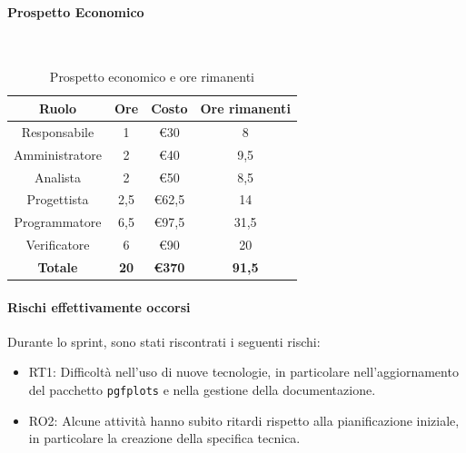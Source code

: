 \documentclass{article}
\begin{document}
            \paragraph{Prospetto Economico}\mbox{}\\
            \begin{table}[H]
                \centering
                \begin{tabular}{|c|c|c|c|}
                \hline
                \textbf{Ruolo}  & \textbf{Ore}  & \textbf{Costo}      & \textbf{Ore rimanenti}   \\ \hline
                Responsabile    & 1             & €30                 & 8                        \\ \hline
                Amministratore  & 2             & €40                 & 9,5                      \\ \hline
                Analista        & 2             & €50                 & 8,5                      \\ \hline
                Progettista     & 2,5           & €62,5               & 14                       \\ \hline
                Programmatore   & 6,5           & €97,5               & 31,5                     \\ \hline
                Verificatore    & 6             & €90                 & 20                       \\ \hline
                \textbf{Totale} & \textbf{20}   & \textbf{\euro370}   & \textbf{91,5}            \\ \hline
                \end{tabular}
                \caption{Prospetto economico e ore rimanenti}
            \end{table}
            
            \paragraph{Rischi effettivamente occorsi}
            Durante lo sprint, sono stati riscontrati i seguenti rischi:
            \begin{itemize}
                \item RT1: Difficoltà nell’uso di nuove tecnologie, in particolare nell'aggiornamento del pacchetto \texttt{pgfplots} e nella gestione della documentazione.
                \item RO2: Alcune attività hanno subito ritardi rispetto alla pianificazione iniziale, in particolare la creazione della specifica tecnica.
            \end{itemize}
            
\end{document}
